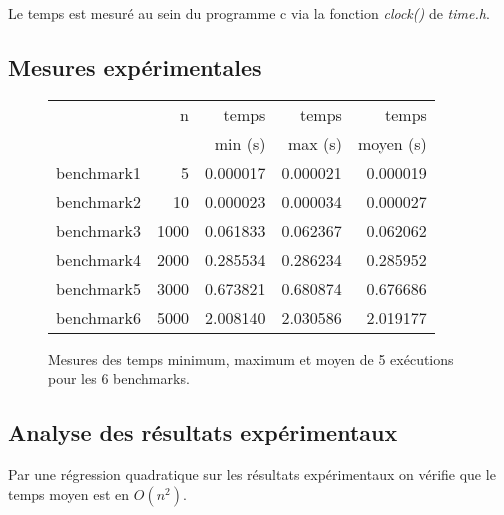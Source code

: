 \documentclass[a4paper, 10pt, french]{article}
\begin{document}
    Le temps est mesuré au sein du programme c via la fonction \emph{clock()} de \textit{time.h}.

  \subsection{Mesures expérimentales}

    \begin{figure}[h]
      \begin{center}
        \begin{tabular}{|l||r||r|r|r||}
          \hline
          \hline
            & n			& temps     & temps   & temps \\
            &			& min (s)   & max (s) & moyen (s)\\
          \hline
          \hline
            benchmark1 & 5 & 0.000017 & 0.000021 & 0.000019 \\
          \hline
            benchmark2 & 10 & 0.000023 & 0.000034 & 0.000027 \\
          \hline
            benchmark3 & 1000 & 0.061833 & 0.062367 & 0.062062 \\
          \hline
            benchmark4 & 2000 & 0.285534 & 0.286234 & 0.285952 \\
          \hline
            benchmark5 & 3000 & 0.673821 & 0.680874 & 0.676686 \\
          \hline
            benchmark6 & 5000 & 2.008140 & 2.030586 & 2.019177 \\
          \hline
          \hline
        \end{tabular}
        \caption{Mesures des temps minimum, maximum et moyen de 5 exécutions pour les 6 benchmarks.}
        \label{table-temps}
      \end{center}
    \end{figure}

\subsection{Analyse des résultats expérimentaux}
Par une régression quadratique sur les résultats expérimentaux on vérifie que le temps moyen est en $O(n^2)$.
\end{document}
